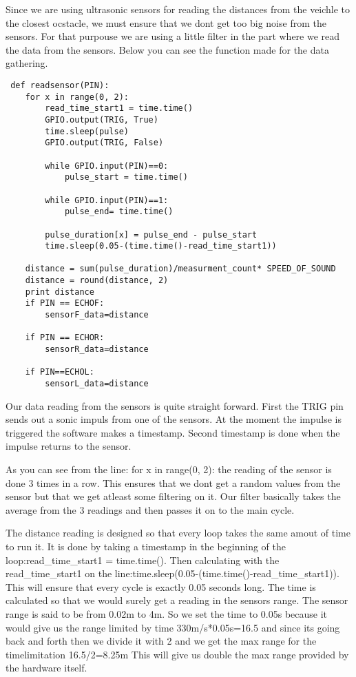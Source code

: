 Since we are using ultrasonic sensors for reading the distances from the veichle to the closest ocstacle, we must ensure that we dont get too big noise from the sensors.
For that purpouse we are using a little filter in the part where we read the data from the sensors.
Below you can see the function made for the data gathering.

\begin{lstlisting}
 def readsensor(PIN):
	for x in range(0, 2):
		read_time_start1 = time.time()
		GPIO.output(TRIG, True)
		time.sleep(pulse)
		GPIO.output(TRIG, False)

		while GPIO.input(PIN)==0:
			pulse_start = time.time()

		while GPIO.input(PIN)==1:
			pulse_end= time.time()

		pulse_duration[x] = pulse_end - pulse_start
		time.sleep(0.05-(time.time()-read_time_start1))

	distance = sum(pulse_duration)/measurment_count* SPEED_OF_SOUND
	distance = round(distance, 2)
	print distance
	if PIN == ECHOF:
		sensorF_data=distance

	if PIN == ECHOR:
		sensorR_data=distance

	if PIN==ECHOL:
		sensorL_data=distance
\end{lstlisting}

Our data reading from the sensors is quite straight forward.
First the TRIG pin sends out a sonic impuls from one of the sensors.
At the moment the impulse is triggered the software makes a timestamp.
Second timestamp is done when the impulse returns to the sensor.

As you can see from the line: for x in range(0, 2): the reading of the sensor is done 3 times in a row.
This ensures that we dont get a random values from the sensor but that we get atleast some filtering on it.
Our filter basically takes the average from the 3 readings and then passes it on to the main cycle.

The distance reading is designed so that every loop takes the same amout of time to run it.
It is done by taking a timestamp in the beginning of the loop:read_time_start1 = time.time().
Then calculating with the read_time_start1 on the line:time.sleep(0.05-(time.time()-read_time_start1)).
This will ensure that every cycle is exactly 0.05 seconds long.
The time is calculated so that we would surely get a reading in the sensors range.
The sensor range is said to be from 0.02m to 4m.
So we set the time to 0.05s because it would give us the range limited by time 330m/s*0.05s=16.5 and since its going back and forth then we divide it with 2 and we get the max range for the timelimitation 16.5/2=8.25m
This will give us double the max range provided by the hardware itself.

